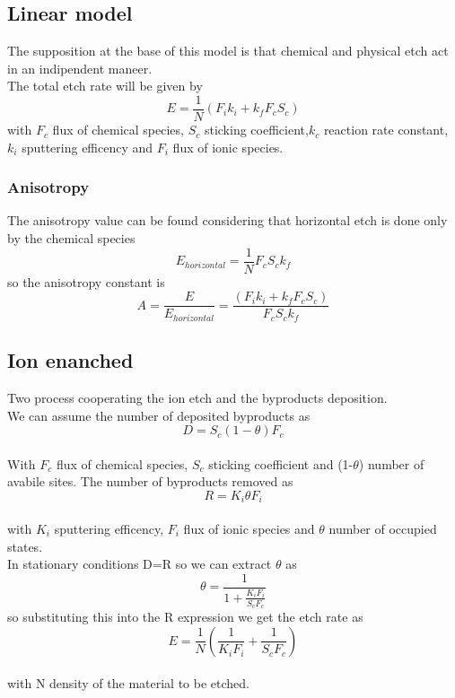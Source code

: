 \subsection{Linear model}
The supposition at the base of this model is that chemical and physical etch act in an indipendent maneer.\\
The total etch rate will be given by
\begin{equation}
E=\frac{1}{N}\left( F_ik_i+k_fF_cS_c \right)
\end{equation}
with $F_c$ flux of chemical species, $S_c$ sticking coefficient,$k_c$ reaction rate constant, $k_i$ sputtering efficency and $F_i$ flux of ionic species.\\
\vspace{5mm}
\subsubsection{Anisotropy}
The anisotropy value can be found considering that horizontal etch is done only by the chemical species 
\begin{equation}
E_{horizontal}=\frac{1}{N}F_cS_ck_f
\end{equation}
so the anisotropy constant is 
\begin{equation}
A=\frac{E}{E_{horizontal}}=\frac{\left( F_ik_i+k_fF_cS_c \right)}{F_cS_ck_f}
\end{equation}


\subsection{Ion enanched}

Two process cooperating the ion etch and the byproducts deposition.\\
We can assume the number of deposited byproducts as
\begin{equation}
D=S_c(1-\theta)F_c
\end{equation}
\\
With $F_c$ flux of chemical species, $S_c$ sticking coefficient and (1-$\theta$) number of avabile sites.
The number of byproducts removed as
\begin{equation}
R=K_i\theta F_i
\end{equation}
\\
with $K_i$ sputtering efficency, $F_i$ flux of ionic species and $\theta$ number of occupied states.\\

In stationary conditions D=R so we can extract $\theta$ as
\begin{equation}
\theta=\frac{1}{1+\frac{K_iF_i}{S_cF_c}}
\end{equation}
so substituting this into the R expression we get the etch rate as 
\begin{equation}
E=\frac{1}{N}\left(\frac{1}{K_iF_i}+\frac{1}{S_cF_c}\right)
\end{equation}
\\
with N density of the material to be etched.\\

